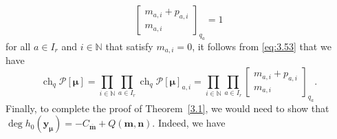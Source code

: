 \documentclass[pdftex]{sigma}
\numberwithin{equation}{section}
\DeclareMathOperator{\ch}{ch}
\begin{document}
\begin{equation*}
\begin{bmatrix} m_{a,i}+p_{a,i}\\m_{a,i}\end{bmatrix}_{q_a}=1
\end{equation*}
for all $a\in I_r$ and $i\in\mathbb{N}$ that satisfy $m_{a,i}=0$, it follows from \eqref{eq:3.53} that we have
\begin{equation}\label{eq:3.54}
\ch_q\mathcal{P}[\bm{\mu}]
=\prod_{i\in\mathbb{N}}\prod_{a\in I_r}\ch_q\mathcal{P}[\bm{\mu}]_{a,i}
=\prod_{i\in\mathbb{N}}\prod_{a\in I_r}\begin{bmatrix} m_{a,i}+p_{a,i} \\m_{a,i}\end{bmatrix}_{q_a}.
\end{equation}
Finally, to complete the proof of Theorem~\ref{3.1}, we would need to show that $\deg h_0(\mathbf{y}_{\bm{\mu}})=-C_{\overline{ \mathbf{m}}}+Q(\mathbf{m},\mathbf{n})$. Indeed, we have
\end{document}
